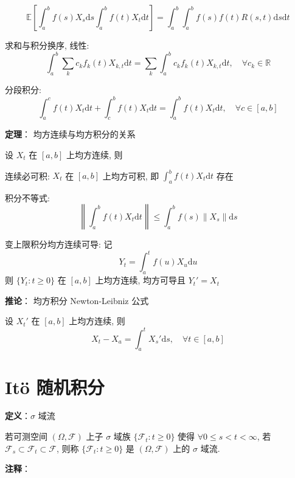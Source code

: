 \documentclass[openany]{ctexbook}
\theoremstyle{kaiti}
\theoremstyle{normal}
\begin{document}
\begin{equation}
  \mathbb{E}\left[\int_a^bf(s)X_s\mathrm{d}s\int_a^bf(t)X_t\mathrm{d}t\right]=\int_a^b\int_a^bf(s)f(t)R(s,t)\mathrm{d}s\mathrm{d}t
\end{equation}

求和与积分换序, 线性:
\begin{equation}
  \int_a^b\sum_kc_kf_k(t)X_{k,t}\mathrm{d}t=\sum_k\int_a^bc_kf_k(t)X_{k,t}\mathrm{d}t,\quad\forall c_k\in\mathbb{R}
\end{equation}

分段积分:
\begin{equation}
  \int_a^cf(t)X_t\mathrm{d}t+\int_c^bf(t)X_t\mathrm{d}t=\int_a^bf(t)X_t\mathrm{d}t,\quad\forall c\in[a,b]
\end{equation}

\textbf{定理}： 均方连续与均方积分的关系

设 $X_t$ 在 $[a,b]$ 上均方连续, 则

连续必可积: $X_t$ 在 $[a,b]$ 上均方可积, 即 $\displaystyle\int_a^bf(t)X_t\mathrm{d}t$ 存在

积分不等式:
\begin{equation}
  \left\|\int_a^bf(t)X_t\mathrm{d}t\right\|\leqslant\int_a^bf(s)\|X_s\|\mathrm{d}s
\end{equation}

变上限积分均方连续可导: 记
\begin{equation}
  Y_t=\int_a^tf(u)X_u\mathrm{d}u
\end{equation}
则 $\{Y_t:t\geqslant0\}$ 在 $[a,b]$ 上均方连续, 均方可导且 $Y_t'=X_t$

\textbf{推论}： 均方积分 Newton-Leibniz 公式

设 $X_t'$ 在 $[a,b]$ 上均方连续, 则
\begin{equation}
  X_t-X_a=\int_a^tX_s'\mathrm{d}s,\quad\forall t\in[a,b]
\end{equation}

\section{It\"o 随机积分}

\textbf{定义}：$\sigma$ 域流

若可测空间 $(\Omega,\mathcal{F})$ 上子 $\sigma$ 域族 $\{\mathcal{F}_t:t\geqslant0\}$ 使得 $\forall0\leqslant s<t<\infty$, 若 $\mathcal{F}_s\subset\mathcal{F}_t\subset\mathcal{F}$, 则称 $\{\mathcal{F}_t:t\geqslant0\}$ 是 $(\Omega,\mathcal{F})$ 上的 $\sigma$ 域流.

\textbf{注释}：
\end{document}

